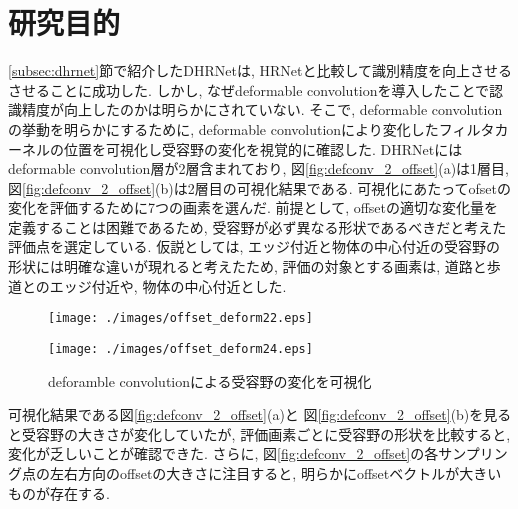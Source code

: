 \section{研究目的}\label{sec:mokuteki}
\ref{subsec:dhrnet}節で紹介したDHRNetは, HRNetと比較して識別精度を向上させるさせることに成功した. しかし, なぜdeformable convolutionを導入したことで認識精度が向上したのかは明らかにされていない. そこで, deformable convolutionの挙動を明らかにするために, deformable convolutionにより変化したフィルタカーネルの位置を可視化し受容野の変化を視覚的に確認した.
DHRNetにはdeformable convolution層が2層含まれており, 図\ref{fig:defconv_2_offset}(a)は1層目, 図\ref{fig:defconv_2_offset}(b)は2層目の可視化結果である. 可視化にあたってofsetの変化を評価するために7つの画素を選んだ. 前提として, offsetの適切な変化量を定義することは困難であるため, 受容野が必ず異なる形状であるべきだと考えた評価点を選定している. 仮説としては, エッジ付近と物体の中心付近の受容野の形状には明確な違いが現れると考えたため, 評価の対象とする画素は, 道路と歩道とのエッジ付近や, 物体の中心付近とした. \\
\begin{figure}[h]
    \begin{minipage}{0.5\hsize}
     \begin{center}
      \texttt{[image: ./images/offset\_deform22.eps]}
       \label{fig:defconv2_1_offset}
      \end{center}
    \end{minipage}
    \begin{minipage}{0.5\hsize}
     \begin{center}
      \texttt{[image: ./images/offset\_deform24.eps]}
      \label{fig:defconv2_2_offset}
      \end{center}
    \end{minipage}
    \caption{deforamble convolutionによる受容野の変化を可視化}
\end{figure} \label{fig:defconv_2_offset}
可視化結果である図\ref{fig:defconv_2_offset}(a)と 図\ref{fig:defconv_2_offset}(b)を見ると受容野の大きさが変化していたが, 評価画素ごとに受容野の形状を比較すると, 変化が乏しいことが確認できた. さらに, 図\ref{fig:defconv_2_offset}の各サンプリング点の左右方向のoffsetの大きさに注目すると, 明らかにoffsetベクトルが大きいものが存在する. \\

